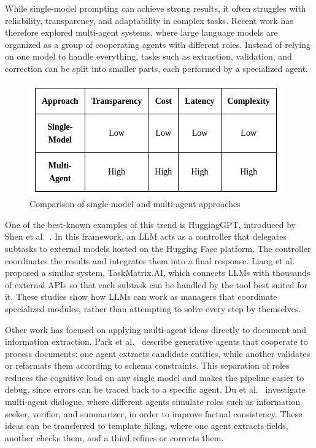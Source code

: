 While single-model prompting can achieve strong results, it often struggles with reliability, transparency, and adaptability in complex tasks. Recent work has therefore explored multi-agent systems, where large language models are organized as a group of cooperating agents with different roles. Instead of relying on one model to handle everything, tasks such as extraction, validation, and correction can be split into smaller parts, each performed by a specialized agent.

\begin{figure}[hbt!]
    \centering
    \includegraphics[width=0.5\linewidth]{images/single_vs_multi_model.png}
    \caption{Comparison of single-model and multi-agent approaches}
    \label{fig:placeholder}
\end{figure}

One of the best-known examples of this trend is HuggingGPT, introduced by Shen et al.\ \cite{shen2023hugginggpt}. In this framework, an LLM acts as a controller that delegates subtasks to external models hosted on the Hugging Face platform. The controller coordinates the results and integrates them into a final response. Liang et al.\ \cite{liang2023taskmatrix} proposed a similar system, TaskMatrix.AI, which connects LLMs with thousands of external APIs so that each subtask can be handled by the tool best suited for it. These studies show how LLMs can work as managers that coordinate specialized modules, rather than attempting to solve every step by themselves.

Other work has focused on applying multi-agent ideas directly to document and information extraction. Park et al.\ \cite{park2023generative} describe generative agents that cooperate to process documents: one agent extracts candidate entities, while another validates or reformats them according to schema constraints. This separation of roles reduces the cognitive load on any single model and makes the pipeline easier to debug, since errors can be traced back to a specific agent. Du et al.\ \cite{du2023improving} investigate multi-agent dialogue, where different agents simulate roles such as information seeker, verifier, and summarizer, in order to improve factual consistency. These ideas can be transferred to template filling, where one agent extracts fields, another checks them, and a third refines or corrects them.

